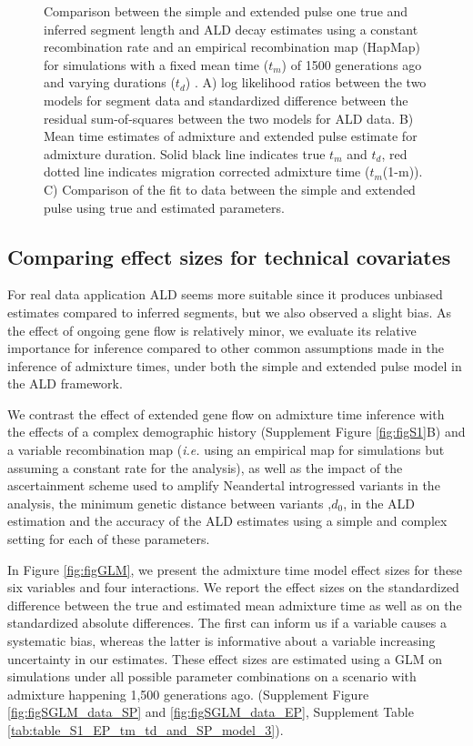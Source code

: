 \documentclass[11pt]{article}
\begin{document}
\begin{figure}
\caption{\label{fig:figResult2} Comparison between the simple and extended pulse one true and inferred segment length and ALD decay estimates using a constant recombination rate and an empirical recombination map (HapMap) for simulations with a fixed mean time ($t_m$) of 1500 generations ago and varying durations ($t_d$) . A) log likelihood ratios between the two models for segment data and standardized difference between the residual sum-of-squares between the two models for ALD data. B) Mean time estimates of admixture and extended pulse estimate for admixture duration. Solid black line indicates true $t_m$ and $t_d$, red dotted line indicates migration corrected admixture time ($t_m$(1-m)). C) Comparison of the fit to data between the simple and extended pulse using true and estimated parameters. }
\end{figure}




\subsection{Comparing effect sizes for technical covariates}\label{comparing effect sizes}


For real data application ALD seems more suitable since it produces unbiased estimates compared to inferred segments, but we also observed a slight bias. As the effect of ongoing gene flow is relatively minor, we evaluate its relative importance for inference compared to other common assumptions made in the inference of admixture times, under both the simple and extended pulse model in the ALD framework.

We contrast the effect of extended gene flow on admixture time inference with  the effects of a complex demographic history (Supplement Figure \ref{fig:figS1}B) and a variable recombination map (\emph{i.e.} using an empirical map for simulations but assuming a constant rate for the analysis), as well as the impact of the ascertainment scheme used to amplify Neandertal introgressed variants in the analysis, the minimum genetic distance between variants ,$d_0$, in the ALD estimation and the accuracy of the ALD estimates using a simple and complex setting for each of these parameters. 


In Figure \ref{fig:figGLM}, we present the admixture time model effect sizes for these six variables and four interactions. We report the effect sizes on the standardized difference between the true and estimated mean admixture time as well as on the standardized absolute differences. The first can inform us if a variable causes a systematic bias, whereas the latter is informative about a variable increasing uncertainty in our estimates. These effect sizes are estimated using a GLM on simulations under all possible parameter combinations on a scenario with admixture happening 1,500 generations ago. (Supplement Figure \ref{fig:figSGLM_data_SP} and \ref{fig:figSGLM_data_EP}, Supplement Table \ref{tab:table_S1_EP_tm_td_and_SP_model_3}).
\end{document}
